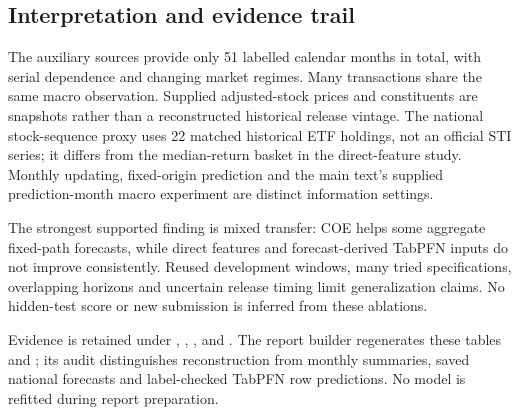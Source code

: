 \documentclass[conference]{IEEEtran}
\begin{document}
\subsection{Interpretation and evidence trail}
The auxiliary sources provide only 51 labelled calendar months in total, with serial dependence and changing market regimes. Many transactions share the same macro observation. Supplied adjusted-stock prices and constituents are snapshots rather than a reconstructed historical release vintage. The national stock-sequence proxy uses 22 matched historical ETF holdings, not an official STI series; it differs from the median-return basket in the direct-feature study. Monthly updating, fixed-origin prediction and the main text's supplied prediction-month macro experiment are distinct information settings.

The strongest supported finding is mixed transfer: COE helps some aggregate fixed-path forecasts, while direct features and forecast-derived TabPFN inputs do not improve consistently. Reused development windows, many tried specifications, overlapping horizons and uncertain release timing limit generalization claims. No hidden-test score or new submission is inferred from these ablations.

Evidence is retained under , , ,  and . The report builder regenerates these tables and ; its audit distinguishes reconstruction from monthly summaries, saved national forecasts and label-checked TabPFN row predictions. No model is refitted during report preparation.
\par\endgroup
\end{document}
